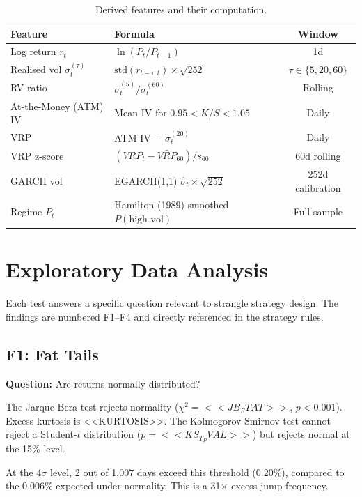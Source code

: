\documentclass[11pt,a4paper]{article}
\begin{document}
\begin{table}[H]
\centering
\caption{Derived features and their computation.}
\label{tab:features}
\begin{tabular}{llc}
\toprule
Feature & Formula & Window \\
\midrule
Log return $r_t$ & $\ln(P_t/P_{t-1})$ & 1d \\
Realised vol $\sigma^{(\tau)}_t$ & $\text{std}(r_{t-\tau:t}) \times \sqrt{252}$ & $\tau \in \{5,20,60\}$ \\
RV ratio & $\sigma^{(5)}_t / \sigma^{(60)}_t$ & Rolling \\
At-the-Money (ATM) IV & Mean IV for $0.95 < K/S < 1.05$ & Daily \\
VRP & ATM IV $-$ $\sigma^{(20)}_t$ & Daily \\
VRP z-score & $(VRP_t - \bar{VRP}_{60}) / s_{60}$ & 60d rolling \\
GARCH vol & EGARCH(1,1) $\hat{\sigma}_t \times \sqrt{252}$ & 252d calibration \\
Regime $P_t$ & Hamilton (1989) smoothed $P(\text{high-vol})$ & Full sample \\
\bottomrule
\end{tabular}
\end{table}


\section{Exploratory Data Analysis}
\label{sec:eda}

Each test answers a specific question relevant to strangle strategy design. The findings are numbered F1--F4 and directly referenced in the strategy rules.

\subsection{F1: Fat Tails}

\textbf{Question:} Are returns normally distributed?

The Jarque-Bera test rejects normality ($\chi^2 = <<JB_STAT>>$, $p < 0.001$). Excess kurtosis is <<KURTOSIS>>. The Kolmogorov-Smirnov test cannot reject a Student-$t$ distribution ($p = <<KS_T_PVAL>>$) but rejects normal at the 15\% level.

At the 4$\sigma$ level, 2 out of 1,007 days exceed this threshold (0.20\%), compared to the 0.006\% expected under normality. This is a 31$\times$ excess jump frequency.
\end{document}
